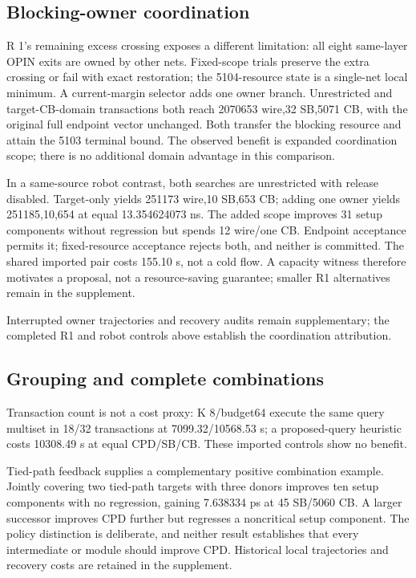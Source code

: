 \documentclass[conference,10pt]{IEEEtran}
\begin{document}
\subsection{Blocking-owner coordination}
R 1's remaining excess crossing exposes a different limitation: all eight same-layer OPIN exits are owned by other nets. Fixed-scope trials preserve the extra crossing or fail with exact restoration; the 5104-resource state is a single-net local minimum. A current-margin selector adds one owner branch. Unrestricted and target-CB-domain transactions both reach 2070653 wire,32 SB,5071 CB, with the original full endpoint vector unchanged. Both transfer the blocking resource and attain the 5103 terminal bound. The observed benefit is expanded coordination scope; there is no additional domain advantage in this comparison.

In a same-source robot contrast, both searches are unrestricted with release disabled. Target-only yields 251173 wire,10 SB,653 CB; adding one owner yields 251185,10,654 at equal 13.354624073 ns. The added scope improves 31 setup components without regression but spends 12 wire/one CB. Endpoint acceptance permits it; fixed-resource acceptance rejects both, and neither is committed. The shared imported pair costs 155.10 s, not a cold flow. A capacity witness therefore motivates a proposal, not a resource-saving guarantee; smaller R1 alternatives remain in the supplement.

Interrupted owner trajectories and recovery audits remain supplementary; the completed R1 and robot controls above establish the coordination attribution.

\subsection{Grouping and complete combinations}
Transaction count is not a cost proxy: K 8/budget64 execute the same query multiset in 18/32 transactions at 7099.32/10568.53 s; a proposed-query heuristic costs 10308.49 s at equal CPD/SB/CB. These imported controls show no benefit.

Tied-path feedback supplies a complementary positive combination example. Jointly covering two tied-path targets with three donors improves ten setup components with no regression, gaining 7.638334 ps at 45 SB/5060 CB. A larger successor improves CPD further but regresses a noncritical setup component. The policy distinction is deliberate, and neither result establishes that every intermediate or module should improve CPD. Historical local trajectories and recovery costs are retained in the supplement.
\end{document}
